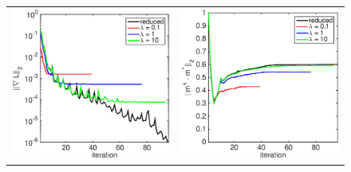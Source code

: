 \documentclass{iopart}
\begin{document}
\begin{figure}
\centering
\begin{tabular}{cc}
\includegraphics[scale=.3]{./figs/2D_exp3_b}&
\includegraphics[scale=.3]{./figs/2D_exp3_c}\\
\end{tabular}

\end{figure}
\end{document}
